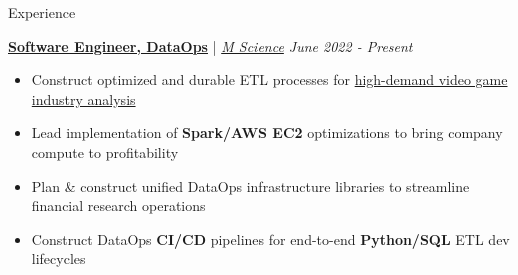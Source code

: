\documentclass{content/resume/resume}
\begin{document}
\begin{rSection}{Experience}

  \href{https://www.linkedin.com/posts/m-science-llc_how-m-science-uses-databricks-structured-activity-6953752015013363713-EOTN/}{\bf Software Engineer, DataOps} | {\em \href{https://mscience.com}{M Science} \hfill June 2022 - Present}
  \vspace{-6pt}
  \begin{itemize}[nosep]
    \item Construct optimized and durable ETL processes for \href{https://www.linkedin.com/search/results/content/?fromOrganization=\%5B\%2210801123\%22\%5D&keywords=game&origin=GLOBAL_SEARCH_HEADER&sid=5eJ&sortBy=\%22date_posted\%22}{high-demand video game industry analysis}
    \item Lead implementation of {\bf Spark/AWS EC2} optimizations to bring company compute to profitability
    \item Plan \& construct unified DataOps infrastructure libraries to streamline financial research operations
    \item Construct DataOps {\bf CI/CD} pipelines for end-to-end {\bf Python/SQL} ETL dev lifecycles
  \end{itemize}
  

\end{rSection}
\end{document}
